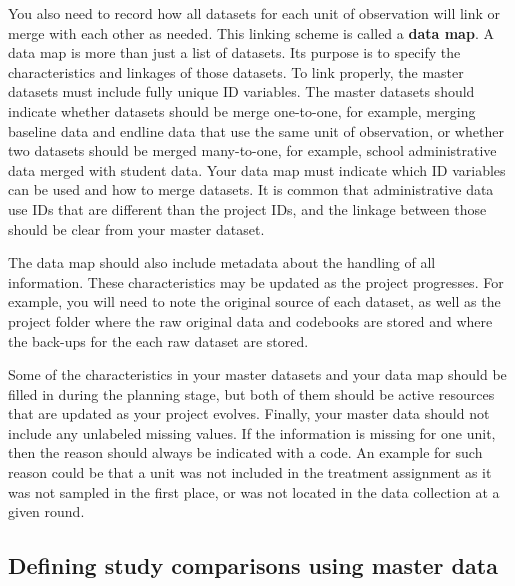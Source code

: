 You also need to record how all datasets for each unit of observation
will link or merge with each other as needed.
This linking scheme is called a \textbf{data map}.
A data map is more than just a list of datasets.
Its purpose is to specify the characteristics and linkages of those datasets.
To link properly, the master datasets must include fully unique ID variables.
The master datasets should indicate whether datasets should be merge one-to-one,
for example, merging baseline data and endline data that use the same unit of observation,
or whether two datasets should be merged many-to-one, 
for example, school administrative data merged with student data.
Your data map must indicate which ID variables can be used and how to merge datasets.
It is common that administrative data use IDs 
that are different than the project IDs, 
and the linkage between those should be clear from your master dataset.

The data map should also include metadata about the handling of all information.
These characteristics may be updated as the project progresses.
For example, you will need to note the original source of each dataset,
as well as the project folder where 
the raw original data and codebooks are stored
and where the back-ups for the each raw dataset are stored.

Some of the characteristics in your master datasets and your data map
should be filled in during the planning stage,
but both of them should be active resources 
that are updated as your project evolves.
Finally, your master data should not include any unlabeled missing values. 
If the information is missing for one unit, 
then the reason should always be indicated with a code.
An example for such reason could be that a unit was not included in the treatment assignment
as it was not sampled in the first place,
or was not located in the data collection at a given round.

\subsection{Defining study comparisons using master data}

